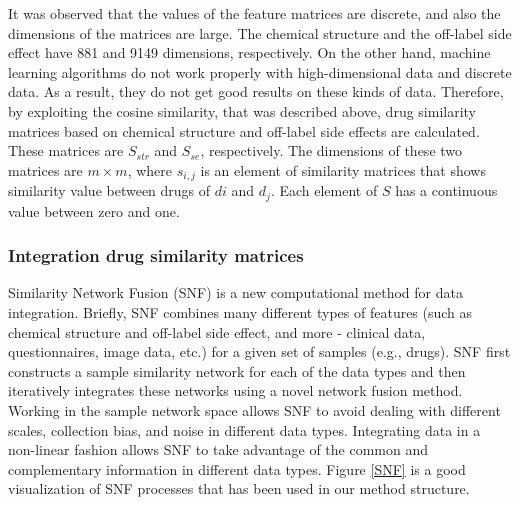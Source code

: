 \documentclass{bmcart}
\begin{document}
It was observed that the values of the feature matrices are discrete, and also the dimensions of the matrices are large. The chemical structure and the off-label side effect have 881 and 9149 dimensions, respectively. On the other hand, machine learning algorithms do not work properly with high-dimensional data and discrete data. As a result, they do not get good results on these kinds of data. Therefore, by exploiting the cosine similarity, that was described above, drug similarity matrices based on chemical structure and off-label side effects are calculated. These matrices are $S_{str}$ and $S_{se}$, respectively. The dimensions of these two matrices are $m \times m$, where $s_{i,j}$ is an element of similarity matrices that shows similarity value between drugs of $di$ and $d_j$. Each element of $S$ has a continuous value between zero and one.

\subsubsection*{Integration drug similarity matrices}
Similarity Network Fusion (SNF)\cite{wang2014similarity} is a new computational method for data integration.  Briefly, SNF combines many different types of features (such as chemical structure and off-label side effect, and more - clinical data, questionnaires, image data, etc.) for a given set of samples (e.g., drugs). SNF first constructs a sample similarity network for each of the data types and then iteratively integrates these networks using a novel network fusion method. Working in the sample network space allows SNF to avoid dealing with different scales, collection bias, and noise in different data types. Integrating data in a non-linear fashion allows SNF to take advantage of the common and complementary information in different data types. Figure \ref{SNF} is a good visualization of SNF processes  that has been used in our method structure.
\end{document}
